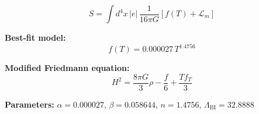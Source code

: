 
\begin{equation}
  S = \int d^4x \, |e| \, \frac{1}{16\pi G} \left[ f(T) + \mathcal{L}_m \right]
\end{equation}

\textbf{Best-fit model:}
\begin{equation}
  f(T) = 0.000027 \, T^{1.4756}
\end{equation}

\textbf{Modified Friedmann equation:}
\begin{equation}
  H^2 = \frac{8\pi G}{3} \rho - \frac{f}{6} + \frac{T f_T}{3}
\end{equation}

\textbf{Parameters:}
$\alpha = 0.000027$, \quad
$\beta = 0.058644$, \quad
$n = 1.4756$, \quad
$\Lambda_{\text{BI}} = 32.8888$